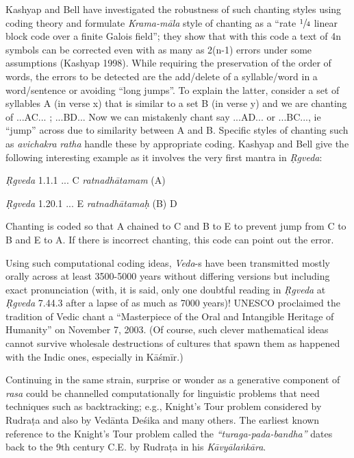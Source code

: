 Kashyap and Bell have investigated the robustness of such chanting styles using coding theory and formulate \textsl{Krama-māla} style of chanting as a “rate $\sfrac{1}{4}$ linear block code over a finite Galois field”; they show that with this code a text of 4n symbols can be corrected even with as many as 2(n-1) errors under some assumptions (Kashyap 1998). While requiring the preservation of the order of words, the errors to be detected are the add/delete of a syllable/word in a word/sentence or avoiding “long jumps”. To explain the latter, consider a set of syllables A (in verse x) that is similar to a set B (in verse y) and we are chanting of  ...AC... ; ...BD... Now we can mistakenly chant say ...AD... or ...BC..., ie “jump” across due to similarity between A and B. Specific styles of chanting such as \textsl{avichakra} \textsl{ratha} handle these by appropriate coding. Kashyap and Bell give the following interesting example as it involves the very first mantra in \textsl{Ṛgveda}:


\begin{myquote}
\textsl{Ṛgveda} 1.1.1     ... C \textsl{ratnadhātamam} (A)

\textsl{Ṛgveda} 1.20.1    ... E \textsl{ratnadhātamaḥ} (B) D
\end{myquote}

Chanting is coded so that A chained to C and B to E to prevent jump from C to B and E to A. If there is incorrect chanting, this code can point out the error. 

Using such computational coding ideas, \textsl{Veda}-s have been transmitted mostly orally across at least 3500-5000 years without differing versions but including exact pronunciation (with, it is said, only one doubtful reading in \textsl{Ṛgveda} at \textsl{Ṛgveda} 7.44.3 after a lapse of as much as 7000 years)! UNESCO proclaimed the tradition of Vedic chant a “Masterpiece of the Oral and Intangible Heritage of Humanity” on November 7, 2003. (Of course, such clever mathematical ideas cannot survive wholesale destructions of cultures that spawn them as happened with the Indic ones, especially in Kāśmīr.)

Continuing in the same strain, surprise or wonder as a generative component of \textsl{rasa} could be channelled computationally for linguistic problems that need techniques such as backtracking; e.g., Knight’s Tour problem considered by Rudraṭa and also by Vedānta Deśika and many others. The earliest known reference to the Knight's Tour problem called the \textsl{``turaga-pada-bandha''} dates back to the 9th century C.E. by Rudraṭa in his \textsl{Kāvyālaṅkāra}.

